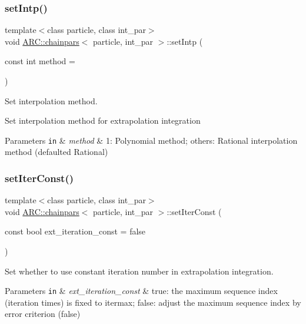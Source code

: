 \subsubsection{\texorpdfstring{set\+Intp()}{setIntp()}}
{\footnotesize\ttfamily template$<$class particle, class int\+\_\+par$>$ \\
void \hyperlink{classARC_1_1chainpars}{A\+R\+C\+::chainpars}$<$ particle, int\+\_\+par $>$\+::set\+Intp (\begin{DoxyParamCaption}\item[{const int}]{method = {} }\end{DoxyParamCaption})\hspace{0.3cm}{\ttfamily [inline]}}



Set interpolation method. 

Set interpolation method for extrapolation integration 
\begin{DoxyParams}[1]{Parameters}
\mbox{\tt in}  & {\em method} & 1\+: Polynomial method; others\+: Rational interpolation method (defaulted Rational) \\
\hline
\end{DoxyParams}
\hypertarget{classARC_1_1chainpars_ab235a48e936eadc412b72e4468106281}{}\label{classARC_1_1chainpars_ab235a48e936eadc412b72e4468106281} 
\subsubsection{\texorpdfstring{set\+Iter\+Const()}{setIterConst()}}
{\footnotesize\ttfamily template$<$class particle, class int\+\_\+par$>$ \\
void \hyperlink{classARC_1_1chainpars}{A\+R\+C\+::chainpars}$<$ particle, int\+\_\+par $>$\+::set\+Iter\+Const (\begin{DoxyParamCaption}\item[{const bool}]{ext\+\_\+iteration\+\_\+const = {\ttfamily false} }\end{DoxyParamCaption})\hspace{0.3cm}{\ttfamily [inline]}}



Set whether to use constant iteration number in extrapolation integration. 


\begin{DoxyParams}[1]{Parameters}
\mbox{\tt in}  & {\em ext\+\_\+iteration\+\_\+const} & true\+: the maximum sequence index (iteration times) is fixed to itermax; false\+: adjust the maximum sequence index by error criterion (false) \\
\hline
\end{DoxyParams}
\hypertarget{classARC_1_1chainpars_ae4a570ffa08b9beee98fc352f6e75b80}{}\label{classARC_1_1chainpars_ae4a570ffa08b9beee98fc352f6e75b80} 
